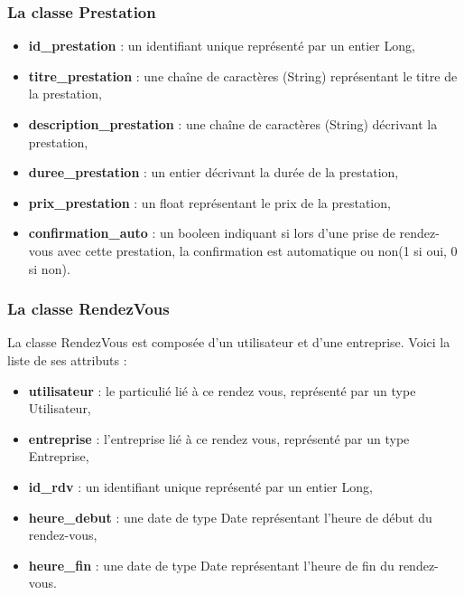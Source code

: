 \documentclass{article}
\begin{document}
\subsubsection{La classe Prestation}
\begin{itemize}
\item \textbf{id\_prestation} : un identifiant unique représenté par un entier Long,
\item \textbf{titre\_prestation} : une chaîne de caractères (String) représentant le titre de la prestation,
\item \textbf{description\_prestation} : une chaîne de caractères (String) décrivant la prestation,
\item \textbf{duree\_prestation} : un entier décrivant la durée de la prestation,
\item \textbf{prix\_prestation} : un float représentant le prix de la prestation,
\item \textbf{confirmation\_auto} : un booleen indiquant si lors d'une prise de rendez-vous avec cette prestation, la confirmation est automatique ou non(1 si oui, 0 si non).

\end{itemize}

\subsubsection{La classe RendezVous}
La classe RendezVous est composée d'un utilisateur et d'une entreprise.
Voici la liste de ses attributs :
\begin{itemize}\item 
\textbf{utilisateur} : le particulié lié à ce rendez vous, représenté par un type Utilisateur,
\item \textbf{entreprise} : l'entreprise lié à ce rendez vous, représenté par un type Entreprise,
\item \textbf{id\_rdv} : un identifiant unique représenté par un entier Long,
\item \textbf{heure\_debut} : une date de type Date représentant l'heure de début du rendez-vous,
\item \textbf{heure\_fin} : une date de type Date représentant l'heure de fin du rendez-vous.
\end{itemize}
\end{document}
